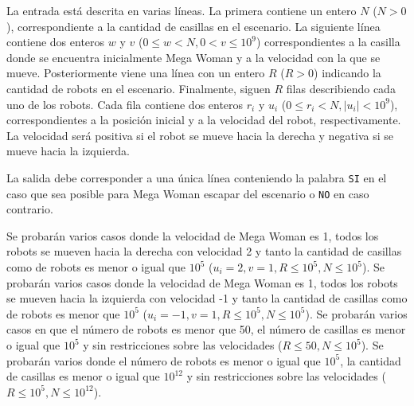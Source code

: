 \documentclass{oci}
\begin{document}
\begin{problemDescription}
\end{problemDescription}

\begin{inputDescription}
  La entrada está descrita en varias líneas.
  La primera contiene un entero $N$ ($N>0$), correspondiente a la cantidad de
  casillas en el escenario.
  La siguiente línea contiene dos enteros $w$ y $v$ ($0\leq w< N, 0<v\leq 10^9$)
  correspondientes a la casilla donde se encuentra inicialmente Mega Woman y a la
  velocidad con la que se mueve.
  Posteriormente viene una línea con un entero $R$ ($R>0$) indicando la cantidad de
  robots en el escenario.
  Finalmente, siguen $R$ filas describiendo cada uno de los robots.
  Cada fila contiene dos enteros $r_i$ y $u_i$ ($0\leq r_i < N, |u_i|< 10^9$),
  correspondientes a la posición inicial y a la velocidad del
  robot, respectivamente.
  La velocidad será positiva si el robot se mueve hacia la derecha y negativa si
  se mueve hacia la izquierda.
\end{inputDescription}

\begin{outputDescription}
La salida debe corresponder a una única línea conteniendo la palabra \texttt{SI}
en el caso que sea posible para Mega Woman escapar del escenario o \texttt{NO}
en caso contrario.
\end{outputDescription}

\begin{scoreDescription}
   Se probarán varios casos donde la velocidad de Mega Woman es 1,
  todos los robots se mueven hacia la derecha con velocidad 2 y tanto la
  cantidad de casillas como de robots es menor o igual que $10^5$ ($u_i=2, v=1,
  R\leq 10^5, N\leq 10^5$).
   Se probarán varios casos donde la velocidad de Mega Woman es 1,
  todos los robots se mueven hacia la izquierda con velocidad -1 y tanto la cantidad
  de casillas como de robots es menor que $10^5$ ($u_i=-1, v=1, R\leq 10^5,
  N\leq 10^5$).
   Se probarán varios casos en que el número de robots es menor que
  50, el número de casillas es menor o igual que $10^5$ y sin restricciones sobre las
  velocidades ($R\leq 50, N\leq 10^5$).
   Se probarán varios donde el número de robots es menor o igual que
  $10^5$, la cantidad de casillas es menor o igual que $10^{12}$ y sin
  restricciones sobre las velocidades ($R\leq 10^5, N \leq10^{12}$).
\end{scoreDescription}

\begin{sampleDescription}
\end{sampleDescription}
\end{document}
